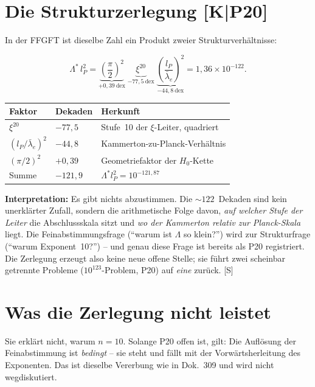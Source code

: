 \section{Die Strukturzerlegung [K|P20]}

In der FFGFT ist dieselbe Zahl ein Produkt zweier Strukturverhältnisse:

\begin{equation}
  \Lambda^{*}\,l_P^{2}
  = \underbrace{\left(\frac{\pi}{2}\right)^{2}}_{+0{,}39~\text{dex}}
    \;\underbrace{\xi^{20}}_{-77{,}5~\text{dex}}
    \;\underbrace{\left(\frac{l_P}{\bar\lambda_e}\right)^{2}}_{-44{,}8~\text{dex}}
  = 1{,}36\times10^{-122}.
  \label{eq:zerlegung}
\end{equation}

\begin{center}
\begin{tabular}{lll}
\toprule
Faktor & Dekaden & Herkunft \\
\midrule
$\xi^{20}$ & $-77{,}5$ & Stufe~10 der $\xi$-Leiter, quadriert \\
$(l_P/\bar\lambda_e)^2$ & $-44{,}8$ & Kammerton-zu-Planck-Verhältnis \\
$(\pi/2)^2$ & $+0{,}39$ & Geometriefaktor der $H_0$-Kette \\
\midrule
Summe & $-121{,}9$ & $\Lambda^{*}l_P^2 = 10^{-121{,}87}$ \\
\bottomrule
\end{tabular}
\end{center}

\textbf{Interpretation:} Es gibt nichts abzustimmen. Die
$\sim\!122$~Dekaden sind kein unerklärter Zufall, sondern die
arithmetische Folge davon, \emph{auf welcher Stufe der Leiter} die
Abschlussskala sitzt und \emph{wo der Kammerton relativ zur
Planck-Skala} liegt. Die Feinabstimmungsfrage
(\enquote{warum ist $\Lambda$ so klein?}) wird zur Strukturfrage
(\enquote{warum Exponent~10?}) -- und genau diese Frage ist bereits
als P20 registriert. Die Zerlegung erzeugt also keine neue offene
Stelle; sie führt zwei scheinbar getrennte Probleme
($10^{123}$-Problem, P20) auf \emph{eine} zurück. [S]

\section{Was die Zerlegung nicht leistet}

Sie erklärt nicht, warum $n=10$. Solange P20 offen ist, gilt: Die
Auflösung der Feinabstimmung ist \emph{bedingt} -- sie steht und
fällt mit der Vorwärtsherleitung des Exponenten. Das ist dieselbe
Vererbung wie in Dok.~309 und wird nicht wegdiskutiert.

